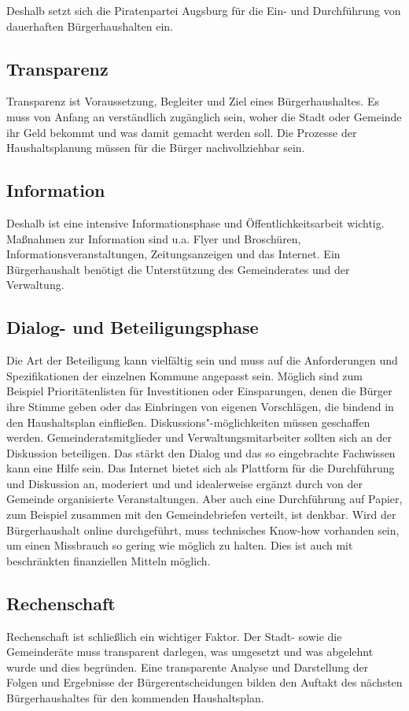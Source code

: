   Deshalb setzt sich die Piratenpartei Augsburg für die Ein- und Durchführung 
  von dauerhaften Bürgerhaushalten ein.
  
  \subsection{Transparenz}
  
  Transparenz ist Voraussetzung, Begleiter und Ziel eines Bürgerhaushaltes. Es 
  muss von Anfang an verständlich zugänglich sein, woher die Stadt oder 
  Gemeinde ihr Geld bekommt und was damit gemacht werden soll. Die Prozesse 
  der Haushaltsplanung müssen für die Bürger nachvollziehbar sein.
  
  \subsection{Information}
  
  Deshalb ist eine intensive Informationsphase und Öffentlichkeitsarbeit 
  wichtig. Maßnahmen zur Information sind u.a. Flyer und Broschüren, 
  Informationsveranstaltungen, Zeitungsanzeigen und das Internet. Ein 
  Bürgerhaushalt benötigt die Unterstützung des Gemeinderates und der 
  Verwaltung.
  
  \subsection{Dialog- und Beteiligungsphase}
  
  Die Art der Beteiligung kann vielfältig sein und muss auf die Anforderungen 
  und Spezifikationen der einzelnen Kommune angepasst sein. Möglich sind zum 
  Beispiel Prioritätenlisten für Investitionen oder Einsparungen, denen die 
  Bürger ihre Stimme geben oder das Einbringen von eigenen Vorschlägen, die 
  bindend in den Haushaltsplan einfließen. Diskussions"-möglichkeiten 
  müssen geschaffen werden. Gemeinderatsmitglieder und 
  Verwaltungsmitarbeiter sollten sich an der Diskussion beteiligen. Das 
  stärkt den Dialog und das so eingebrachte Fachwissen kann eine Hilfe sein. 
  Das Internet bietet sich als Plattform für die Durchführung und Diskussion 
  an, moderiert und und idealerweise ergänzt durch von der Gemeinde 
  organisierte Veranstaltungen. Aber auch eine Durchführung auf Papier, zum 
  Beispiel zusammen mit den Gemeindebriefen verteilt, ist denkbar. Wird der 
  Bürgerhaushalt online durchgeführt, muss technisches Know-how vorhanden 
  sein, um einen Missbrauch so gering wie möglich zu halten. Dies ist auch mit 
  beschränkten finanziellen Mitteln möglich.
  
  \subsection{Rechenschaft}
  
  Rechenschaft ist schließlich ein wichtiger Faktor. Der Stadt- sowie die 
  Gemeinderäte muss transparent darlegen, was umgesetzt und was abgelehnt 
  wurde und dies begründen. Eine transparente Analyse und Darstellung der 
  Folgen und Ergebnisse der Bürgerentscheidungen bilden den Auftakt des 
  nächsten Bürgerhaushaltes für den kommenden Haushaltsplan.
